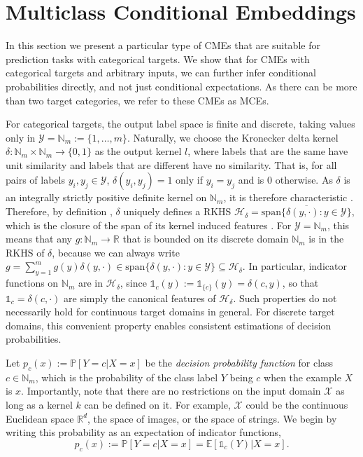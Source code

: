 \documentclass[runningheads, envcountsame, a4paper]{llncs}
\begin{document}
	\section{Multiclass Conditional Embeddings}
	\label{sec:multiclass_conditional_embedding}
	
		In this section we present a particular type of \glspl{CME} that are suitable for prediction tasks with categorical targets. We show that for \glspl{CME} with categorical targets and arbitrary inputs, we can further infer conditional probabilities directly, and not just conditional expectations. As there can be more than two target categories, we refer to these \glspl{CME} as \glspl{MCE}.
	
		For categorical targets, the output label space is finite and discrete, taking values only in $\mathcal{Y} = \mathbb{N}_{m} := \{1, \dots, m\}$. Naturally, we choose the Kronecker delta kernel $\delta : \mathbb{N}_{m} \times \mathbb{N}_{m} \to \{0, 1\}$ as the output kernel $l$, where labels that are the same have unit similarity and labels that are different have no similarity. That is, for all pairs of labels $y_{i}, y_{j} \in \mathcal{Y}$, $\delta(y_{i}, y_{j}) = 1$ only if $y_{i} = y_{j}$ and is $0$ otherwise. As $\delta$ is an integrally strictly positive definite kernel on $\mathbb{N}_{m}$, it is therefore characteristic \citep[Theorem 7]{sriperumbudur2010hilbert}. Therefore, by definition \citep{fukumizu2004dimensionality}, $\delta$ uniquely defines a \gls{RKHS}  $\mathcal{H}_{\delta} = \overline{\mathrm{span}\{\delta(y, \cdot) : y \in \mathcal{Y}\}}$, which is the closure of the span of its kernel induced features \citep{xu2009refinement}. For $\mathcal{Y} = \mathbb{N}_{m}$, this means that any $g : \mathbb{N}_{m} \to \mathbb{R}$ that is bounded on its discrete domain $\mathbb{N}_{m}$ is in the \gls{RKHS} of $\delta$, because we can always write $g = \sum_{y = 1}^{m} g(y) \delta(y, \cdot) \in \mathrm{span}\{\delta(y, \cdot) : y \in \mathcal{Y}\} \subseteq \mathcal{H}_{\delta}$. In particular, indicator functions on $\mathbb{N}_{m}$ are in $\mathcal{H}_{\delta}$, since $\mathbb{1}_{c}(y) := \mathbb{1}_{\{c\}}(y) = \delta(c, y)$, so that $\mathbb{1}_{c} = \delta(c, \cdot)$ are simply the canonical features of $\mathcal{H}_{\delta}$. Such properties do not necessarily hold for continuous target domains in general. For discrete target domains, this convenient property enables consistent estimations of decision probabilities.
	
		Let $p_{c}(x) := \mathbb{P}[Y = c | X = x]$ be the \textit{decision probability function} for class $c \in \mathbb{N}_{m}$, which is the probability of the class label $Y$ being $c$ when the example $X$ is $x$. Importantly, note that there are no restrictions on the input domain $\mathcal{X}$ as long as a kernel $k$ can be defined on it. For example, $\mathcal{X}$ could be the continuous Euclidean space $\mathbb{R}^{d}$, the space of images, or the space of strings. We begin by writing this probability as an expectation of indicator functions,
		\begin{equation}
			p_{c}(x) := \mathbb{P}[Y = c | X = x] = \mathbb{E}[\mathbb{1}_{c}(Y) | X = x].
		\label{eq:decision_probability}
		\end{equation}
		
\end{document}

